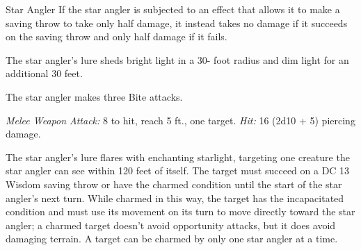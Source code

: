 \documentclass[10pt,a4paper,twoside,bg=print,twocolumn,openany,nodeprecatedcode]{dndbook}
\begin{document}
\begin{DndMonster}[float=t]{Star Angler}
\DndMonsterBasics[
armor-class = {15 (natural armor)},
hit-points = {\DndDice{14d10 + 42}},
speed = {0 ft., fly 40 ft.}
]
\DndMonsterAbilityScores[
 str = 21,
 dex = 15,
 con = 17,
 int = 3,
 wis = 14,
 cha = 6
]
\DndMonsterDetails[
skills = {Perception +5, Stealth +8},
senses = {blindsight 120 ft. (can't see beyond this radius), passive perception 15},
challenge = 8,
]
If the star angler is subjected to an effect that allows it to make a saving throw to take only half damage, it instead takes no damage if it succeeds on the saving throw and only half damage if it fails.

The star angler's lure sheds bright light in a 30- foot radius and dim light for an additional 30 feet.

The star angler makes three Bite attacks.

\textsl{Melee Weapon Attack:} 8 to hit, reach 5 ft., one target. \textsl{Hit:} 16 (2d10 + 5) piercing damage.

The star angler's lure flares with enchanting starlight, targeting one creature the star angler can see within 120 feet of itself. The target must succeed on a DC 13 Wisdom saving throw or have the charmed condition until the start of the star angler's next turn. While charmed in this way, the target has the incapacitated condition and must use its movement on its turn to move directly toward the star angler; a charmed target doesn't avoid opportunity attacks, but it does avoid damaging terrain. A target can be charmed by only one star angler at a time.

\end{DndMonster}
\end{document}
